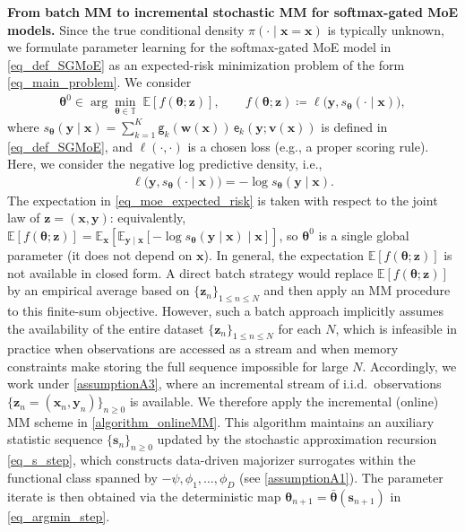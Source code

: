 \documentclass{article}
\newcommand{\md}{softmax-gated MoE }
\def\param{\vtheta}
\def\barparam{\bar{\param}}
\def\sfg{\mathsf{g}}
\def\ex{\mathsf{e}}
\def\rvx{{\mathbf{x}}}
\def\rvy{{\mathbf{y}}}
\def\rvz{{\mathbf{z}}}
\def\vtheta{{\bm{\theta}}}
\def\vs{{\bm{s}}}
\def\vv{{\bm{v}}}
\def\vw{{\bm{w}}}
\def\vx{{\bm{x}}}
\def\vy{{\bm{y}}}
\def\sT{{\mathbb{T}}}
\newcommand{\E}{\mathbb{E}}
\begin{document}
{\bf From batch MM to incremental stochastic MM for \md models.} 
Since the true conditional density $\pi(\cdot\mid \rvx=\vx)$ is typically unknown, we formulate parameter learning for the \md model in \cref{eq_def_SGMoE} as an expected-risk minimization problem of the form \cref{eq_main_problem}. We consider
\begin{align}
    \vtheta^{0} \in \arg\min_{\vtheta\in\sT}\; \E\!\left[f(\vtheta;\rvz)\right],
    \qquad
    f(\vtheta;\rvz)\coloneqq \ell\!\big(\rvy, s_{\vtheta}(\cdot\mid \rvx)\big),
    \label{eq_moe_expected_risk}
\end{align}
where $s_{\vtheta}(\vy\mid \vx)=\sum_{k=1}^K \sfg_k(\vw(\vx))\,\ex_k(\vy;\vv(\vx))$ is defined in \cref{eq_def_SGMoE}, and
$\ell(\cdot,\cdot)$ is a chosen loss (e.g., a proper scoring rule). Here, we consider the negative log predictive density, i.e., 
\begin{align}
    \label{multi_D_lossfunc}
  \ell\!\big(\rvy, s_{\vtheta}(\cdot\mid \rvx)\big) =-\log s_{\vtheta}(\rvy\mid \rvx).
\end{align}
The expectation in \cref{eq_moe_expected_risk} is taken with respect to the joint law of $\rvz=(\rvx,\rvy)$:
equivalently, $\E[f(\vtheta;\rvz)]=\E_{\rvx}\!\left[\E_{\rvy\mid \rvx}\!\left[-\log s_{\vtheta}(\rvy\mid \rvx)\mid \rvx\right]\right]$,
so $\vtheta^{0}$ is a single global parameter (it does not depend on $\vx$). In general, the expectation $\E[f(\vtheta;\rvz)]$ is not available in closed form. A direct batch strategy would replace $\E[f(\vtheta;\rvz)]$ by an empirical average based on
$\{\rvz_n\}_{1\le n\le N}$ and then apply an MM procedure to this finite-sum objective. 
However, such a batch approach implicitly assumes the availability of the entire dataset
$\{\rvz_n\}_{1\le n\le N}$ for each $N$, which is infeasible in practice when observations are accessed as a stream and when memory constraints make storing the full sequence impossible for large $N$.
Accordingly, we work under \cref{assumptionA3}, where an incremental stream of i.i.d.\ observations
$\{\rvz_n=(\rvx_n,\rvy_n)\}_{n\ge 0}$ is available.
We therefore apply the incremental (online) MM scheme in \cref{algorithm_onlineMM}. 
This algorithm maintains an auxiliary statistic sequence $\{\vs_n\}_{n\ge 0}$ updated by the stochastic approximation recursion \cref{eq_s_step}, which constructs data-driven majorizer surrogates within the functional class spanned by $-\psi,\phi_1,\ldots,\phi_D$ (see \cref{assumptionA1}). 
The parameter iterate is then obtained via the deterministic map $\vtheta_{n+1}=\barparam(\vs_{n+1})$ in \cref{eq_argmin_step}.
\end{document}
